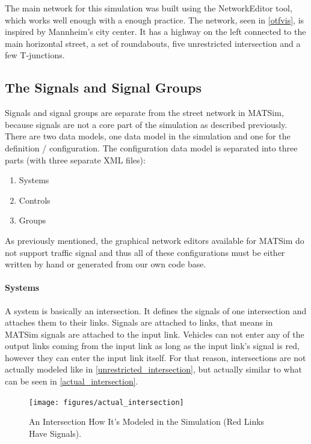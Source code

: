 The main network for this simulation was built using the NetworkEditor tool, which works well enough with a enough practice. The network, seen in \autoref{otfvis}, is inspired by Mannheim's city center. It has a highway on the left connected to the main horizontal street, a set of roundabouts, five unrestricted intersection and a few T-junctions.

\subsection*{The Signals and Signal Groups}

Signals and signal groups are separate from the street network in MATSim, because signals are not a core part of the simulation as described previously. There are two data models, one data model in the simulation and one for the definition / configuration. The configuration data model is separated into three parts (with three separate XML files):

\begin{enumerate}
	\item Systems
	\item Controls
	\item Groups
\end{enumerate}

As previously mentioned, the graphical network editors available for MATSim do not support traffic signal and thus all of these configurations must be either written by hand or generated from our own code base.

\paragraph{Systems} A system is basically an intersection. It defines the signals of one intersection and attaches them to their links. Signals are attached to links, that means in MATSim signals are attached to the input link. Vehicles can not enter any of the output links coming from the input link as long as the input link's signal is red, however they can enter the input link itself. For that reason, intersections are not actually modeled like in \autoref{unrestricted_intersection}, but actually similar to what can be seen in \autoref{actual_intersection}.

\begin{figure}[ht!]
	\centering
	\texttt{[image: figures/actual\_intersection]}
	\caption{An Intersection How It's Modeled in the Simulation (Red Links Have Signals).}
	\label{actual_intersection}
\end{figure}

